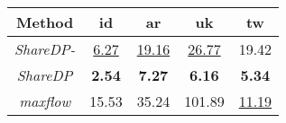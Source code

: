 \begin{tabular}{|c|c|c|c|c|}
\hline
Method & id & ar & uk & tw \\
\hline
\textit{ShareDP-} & \underline{ 6.27 } & \underline{ 19.16 } & \underline{ 26.77 } & 19.42 \\
\textit{ShareDP} & \textbf{ 2.54 } & \textbf{ 7.27 } & \textbf{ 6.16 } & \textbf{ 5.34 } \\
\textit{maxflow} & 15.53 & 35.24 & 101.89 & \underline{ 11.19 } \\
\hline
\end{tabular}